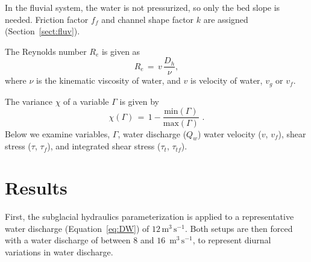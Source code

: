 \documentclass[11pt]{article}
\newcommand{\unit}[1]{$\mathrm{#1}$}
\begin{document}
\begin{spacing}{1}
          In the fluvial system, the water is not pressurized, so only the bed slope is needed. Friction factor $f_f$ and channel shape factor $k$ are assigned (Section~\ref{sect:fluv}).
        
          The Reynolds number $R_e$ is given as 
          \begin{equation}
            \label{eq:re}
            R_e\,=\, v \,\frac{D_h}{\nu},
          \end{equation}
          \noindent where $\nu$ is the kinematic viscosity of water, and  $v$ is velocity of water, $v_g$ or $v_f$.
        
          The variance $ \chi$ of a variable $\Gamma$ is given by 
          \begin{equation}
            \label{eq:var}
            \chi(\Gamma) \,=\, 1 - \frac{\mathrm{min}(\Gamma)}{\mathrm{max}(\Gamma)}\,\,.
          \end{equation}
          \noindent Below we examine variables, $\Gamma$, water discharge ($Q_w$) water velocity ($v$, $v_f$), shear stress ($\tau$, $\tau_f$), and integrated shear stress ($\tau_t$, $\tau_{tf}$).
        
          
          \section{Results}
          First, the subglacial hydraulics parameterization is applied to a representative water discharge (Equation~\ref{eq:DW}) of $12$\,\unit{m}$^{3}$\,\unit{s}$^{-1}$.
          Both setups are then forced with a water discharge of between $8$ and $16$ \,\unit{m}$^{3}$\,\unit{s}$^{-1}$, to represent diurnal variations in water discharge.
          

\end{spacing}
\end{document}
